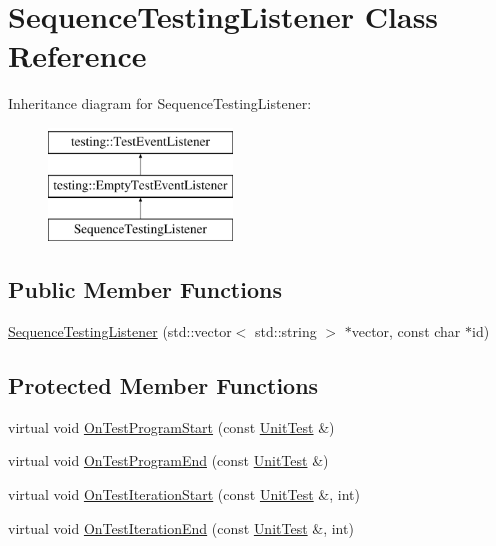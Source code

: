 \hypertarget{classSequenceTestingListener}{}\section{Sequence\+Testing\+Listener Class Reference}
\label{classSequenceTestingListener}
Inheritance diagram for Sequence\+Testing\+Listener\+:\begin{figure}[H]
\begin{center}
\leavevmode
\includegraphics[height=3.000000cm]{classSequenceTestingListener}
\end{center}
\end{figure}
\subsection*{Public Member Functions}
\begin{DoxyCompactItemize}
\item 
\mbox{\hyperlink{classSequenceTestingListener_ac0fcb350d20876f8273621ad4c79ba7a}{Sequence\+Testing\+Listener}} (std\+::vector$<$ std\+::string $>$ $\ast$vector, const char $\ast$id)
\end{DoxyCompactItemize}
\subsection*{Protected Member Functions}
\begin{DoxyCompactItemize}
\item 
virtual void \mbox{\hyperlink{classSequenceTestingListener_a25b96acdbaa6f582e583e6b56bd39b42}{On\+Test\+Program\+Start}} (const \mbox{\hyperlink{classtesting_1_1UnitTest}{Unit\+Test}} \&)
\item 
virtual void \mbox{\hyperlink{classSequenceTestingListener_aacac5e15bac089460841ff63a5c31f57}{On\+Test\+Program\+End}} (const \mbox{\hyperlink{classtesting_1_1UnitTest}{Unit\+Test}} \&)
\item 
virtual void \mbox{\hyperlink{classSequenceTestingListener_a345641262fa10cc4b251ac54116db74b}{On\+Test\+Iteration\+Start}} (const \mbox{\hyperlink{classtesting_1_1UnitTest}{Unit\+Test}} \&, int)
\item 
virtual void \mbox{\hyperlink{classSequenceTestingListener_a783bc01e2a95f5bf73bbde4d96832e0f}{On\+Test\+Iteration\+End}} (const \mbox{\hyperlink{classtesting_1_1UnitTest}{Unit\+Test}} \&, int)
\end{DoxyCompactItemize}


